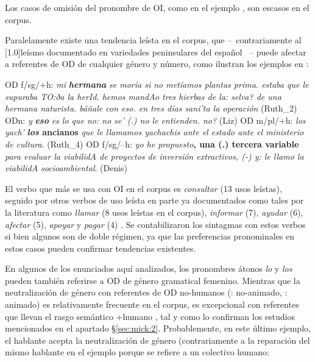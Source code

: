 \documentclass[output=paper]{../langscibook}
\begin{document}
Los casos de omisión del pronombre de OI, como en el ejemplo , son escasos en el corpus.

Paralelamente existe una tendencia leísta en el corpus, que – contrariamente al \scalebox{.9725}[1.0]{leísmo documentado en variedades peninsulares del español} \citep{Fernández-Ordóñez1999} – puede afectar a referentes de OD de cualquier género y número, como ilustran los ejemplos en : %


\ea\label{ex:mick:7}
\ea\label{ex:mick:7a} OD f/sg/+h: \textit{mi} \textbf{\textit{hermana}} \textit{se moría si no metíamos plantas prima. estaba que le supuraba TO:ða la herId. hemos mandAo tres hierbas de la: selva? de una hermana naturista. báñale con eso. en tres días sani'ta la operación} (Ruth\_2)
\ex\label{ex:mick:7b} ODn: \textit{y} \textbf{\textit{eso}} \textit{es lo que no: no se’ (.) no le entienden. no?} (Liz)
\ex\label{ex:mick:7c} OD m/pl/+h: \textit{los yach'} \textbf{\textit{los} \textbf{ancianos}} \textit{que le llamamos yachachis ante el estado ante el ministerio de cultura}. (Ruth\_4)
\ex\label{ex:mick:7d} OD f/sg/–h: \textit{yo he propuesto}\textbf{, \textbf{una} (.) \textbf{tercera} \textbf{variable}} \textit{para evaluar la viabilidA de proyectos de inversión extractivos, (-) y: le llamo la viabilidA socioambiental}. (Denis)
\z
\z

El verbo que más se usa con OI en el corpus es \textit{consultar} (13 usos leístas), seguido por otros verbos de uso leísta en parte ya documentados como tales por la literatura como \textit{llamar} (8 usos leístas en el corpus), \textit{informar} (7), \textit{ayudar} (6), \textit{afectar} (5), \textit{apoyar} y \textit{pagar} (4) \citep{Fernández-Ordóñez1999}. Se contabilizaron los sintagmas con estos verbos si bien algunos son de doble régimen, ya que las preferencias pronominales en estos casos pueden confirmar tendencias existentes.

En algunos de los enunciados aquí analizados, los pronombres átonos \textit{lo} y \textit{los} pueden también referirse a OD de género gramatical femenino. Mientras que la neutralización de género con referentes de OD no-humanos (: no-animado, : animado) es relativamente frecuente en el corpus, es excepcional con referentes que llevan el rasgo semántico +humano , tal y como lo confirman los estudios mencionados en el apartado §\ref{sec:mick:2}. Probablemente, en este último ejemplo, el hablante acepta la neutralización de género (contrariamente a la reparación del mismo hablante en el ejemplo  porque se refiere a un colectivo humano:
\end{document}
